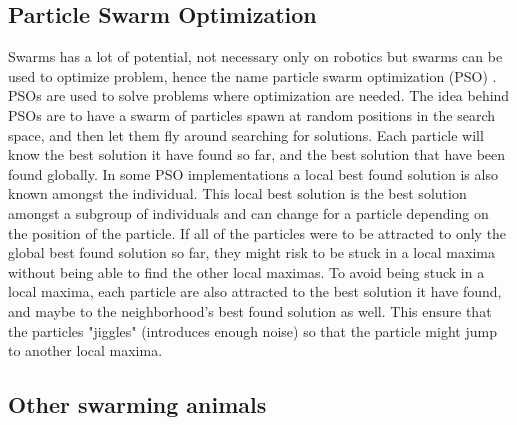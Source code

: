 \subsection{Particle Swarm Optimization}
Swarms has a lot of potential, not necessary only on robotics but swarms can be used to optimize problem, hence the name particle swarm optimization (PSO) \citep{Eberhart}. PSOs are used to solve problems where optimization are needed. The idea behind PSOs are to have a swarm of particles spawn at random positions in the search space, and then let them fly around searching for solutions. Each particle will know the best solution it have found so far, and the best solution that have been found globally. In some PSO implementations a local best found solution is also known amongst the individual. This local best solution is the best solution amongst a subgroup of individuals and can change for a particle depending on the position of the particle. 
If all of the particles were to be attracted to only the global best found solution so far, they might risk to be stuck in a local maxima without being able to find the other local maximas. To avoid being stuck in a local maxima, each particle are also attracted to the best solution it have found, and maybe to the neighborhood's best found solution as well. This ensure that the particles "jiggles" (introduces enough noise) so that the particle might jump to another local maxima. 

\subsection{Other swarming animals}
